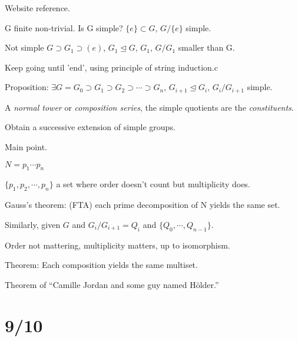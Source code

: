 \documentclass[12pt]{article}
\begin{document}
Website reference.

\noindent
G finite non-trivial.  Is G simple?  $\{e\} \subset G$, $G/\{e\}$ simple.

Not simple $G \supset G_1 \supset (e)$, $G_1 \trianglelefteq G$, $G_1$, $G/G_1$ smaller than G.

Keep going until 'end', using principle of string induction.c

\noindent
Proposition: $\exists G = G_0 \supset G_1 \supset G_2 \supset \cdots \supset G_n$, $G_{i + 1} \trianglelefteq G_i$, $G_i/G_{i+1}$ simple.

A \textit{normal tower} or \textit{composition series}, the simple quotients are the \textit{constituents}.

Obtain a successive extension of simple groups.

\noindent
Main point.

$N = p_1\cdots p_n$

$\{p_1, p_2, \cdots, p_n\}$ a set where order doesn't count but multiplicity does.

Gauss's theorem: (FTA) each prime decomposition of N yields the same set.

\noindent
Similarly, given $G$ and $G_i/G_{i+1} = Q_i$ and $\{Q_0,\cdots , Q_{n-1}\}$.

Order not mattering, multiplicity matters, up to isomorphism.

Theorem: Each composition yields the same multiset.

Theorem of ``Camille Jordan and some guy named H\"{o}lder.''

\section{9/10}
\end{document}
